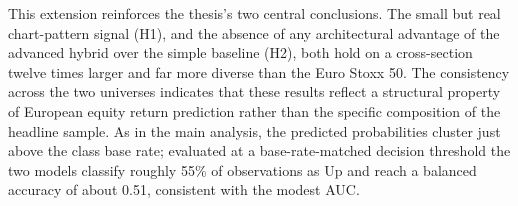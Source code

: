 This extension reinforces the thesis's two central conclusions. The small but
real chart-pattern signal (H1), and the absence of any architectural
advantage of the advanced hybrid over the simple baseline (H2), both hold on
a cross-section twelve times larger and far more diverse than the Euro Stoxx
50. The consistency across the two universes indicates that these results
reflect a structural property of European equity return prediction rather
than the specific composition of the headline sample.
As in the main analysis, the predicted probabilities cluster just above the class base rate; evaluated at a base-rate-matched decision threshold the two models classify roughly 55\% of observations as Up and reach a balanced accuracy of about 0.51, consistent with the modest AUC.
